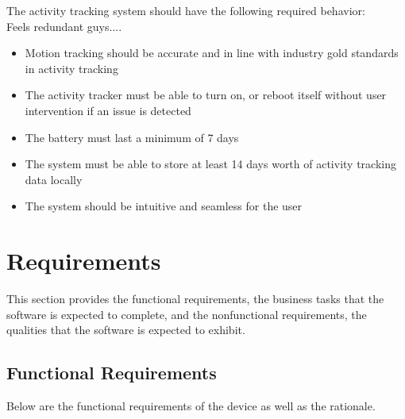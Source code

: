 \documentclass[12pt]{article}
\begin{document}
The activity tracking system should have the following required behavior: \\
Feels redundant guys....

\begin{itemize}
\item Motion tracking should be accurate and in line with industry gold standards in activity tracking\\
\item The activity tracker must be able to turn on, or reboot itself without user intervention if an issue is detected\\
\item The battery must last a minimum of 7 days\\
\item The system must be able to store at least 14 days worth of activity tracking data locally\\
\item The system should be intuitive and seamless for the user\\
\end{itemize} 

\section{Requirements}

This section provides the functional requirements, the business tasks that the
software is expected to complete, and the nonfunctional requirements, the
qualities that the software is expected to exhibit.

\subsection{Functional Requirements}
Below are the functional requirements of the device as well as the rationale.
\end{document}

